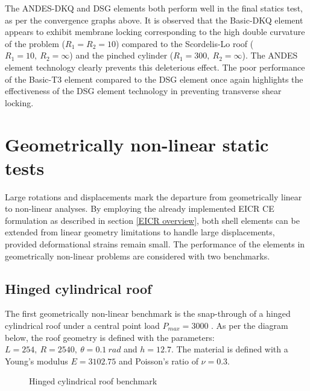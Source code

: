 The ANDES-DKQ and DSG elements both perform well in the final statics test, as per the convergence graphs above. It is observed that the Basic-DKQ element appears to exhibit membrane locking corresponding to the high double curvature of the problem ($R_1=R_2 = 10$) compared to the Scordelis-Lo roof ($R_1= 10,\ R_2 = \infty$) and the pinched cylinder ($R_1= 300,\ R_2 = \infty$). The ANDES element technology clearly prevents this deleterious effect. The poor performance of the Basic-T3 element compared to the DSG element once again highlights the effectiveness of the DSG element technology in preventing transverse shear locking.
\newpage
\section{Geometrically non-linear static tests}

Large rotations and displacements mark the departure from geometrically linear to non-linear analyses. By employing the already implemented EICR CE formulation as described in section \ref{EICR overview}, both shell elements can be extended from linear geometry limitations to handle large displacements, provided deformational strains remain small. The performance of the elements in geometrically non-linear problems are considered with two benchmarks.

\subsection{Hinged cylindrical roof}
\label{validation:hinged cyl roof}
The first geometrically non-linear benchmark is the snap-through of a hinged cylindrical roof under a central point load $P_{max} = 3000$ \cite{Sze2004}. As per the diagram below, the roof geometry is defined with the parameters: $L = 254,\ R = 2540,\ \theta=0.1\ rad$ and $h = 12.7$. The material is defined with a Young's modulus $E = 3102.75$ and Poisson's ratio of $\nu = 0.3$.

 
\begin{figure}[H]
	\caption{\label{ref_label_overall}Hinged cylindrical roof benchmark}
\end{figure}

